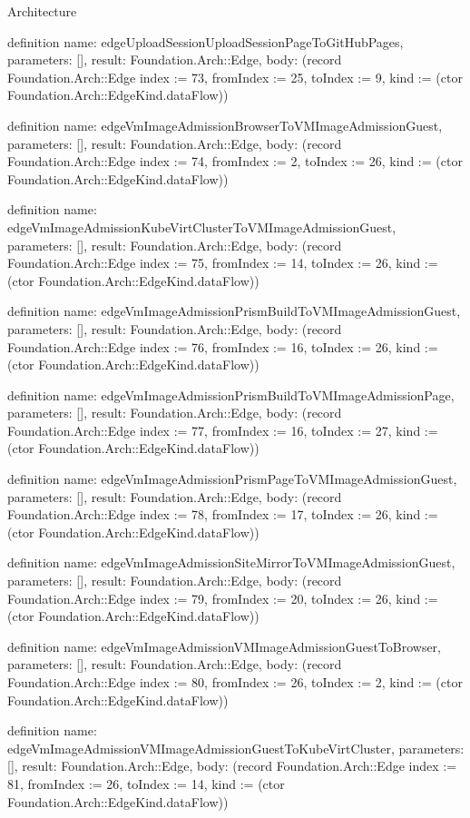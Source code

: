 \begin{lexlean}{Architecture}
\begin{semanticmodule}
definition{
  name: edgeUploadSessionUploadSessionPageToGitHubPages,
  parameters: [],
  result: Foundation.Arch::Edge,
  body: (record Foundation.Arch::Edge {index := 73, fromIndex := 25, toIndex := 9, kind := (ctor Foundation.Arch::EdgeKind.dataFlow)})
}

definition{
  name: edgeVmImageAdmissionBrowserToVMImageAdmissionGuest,
  parameters: [],
  result: Foundation.Arch::Edge,
  body: (record Foundation.Arch::Edge {index := 74, fromIndex := 2, toIndex := 26, kind := (ctor Foundation.Arch::EdgeKind.dataFlow)})
}

definition{
  name: edgeVmImageAdmissionKubeVirtClusterToVMImageAdmissionGuest,
  parameters: [],
  result: Foundation.Arch::Edge,
  body: (record Foundation.Arch::Edge {index := 75, fromIndex := 14, toIndex := 26, kind := (ctor Foundation.Arch::EdgeKind.dataFlow)})
}

definition{
  name: edgeVmImageAdmissionPrismBuildToVMImageAdmissionGuest,
  parameters: [],
  result: Foundation.Arch::Edge,
  body: (record Foundation.Arch::Edge {index := 76, fromIndex := 16, toIndex := 26, kind := (ctor Foundation.Arch::EdgeKind.dataFlow)})
}

definition{
  name: edgeVmImageAdmissionPrismBuildToVMImageAdmissionPage,
  parameters: [],
  result: Foundation.Arch::Edge,
  body: (record Foundation.Arch::Edge {index := 77, fromIndex := 16, toIndex := 27, kind := (ctor Foundation.Arch::EdgeKind.dataFlow)})
}

definition{
  name: edgeVmImageAdmissionPrismPageToVMImageAdmissionGuest,
  parameters: [],
  result: Foundation.Arch::Edge,
  body: (record Foundation.Arch::Edge {index := 78, fromIndex := 17, toIndex := 26, kind := (ctor Foundation.Arch::EdgeKind.dataFlow)})
}

definition{
  name: edgeVmImageAdmissionSiteMirrorToVMImageAdmissionGuest,
  parameters: [],
  result: Foundation.Arch::Edge,
  body: (record Foundation.Arch::Edge {index := 79, fromIndex := 20, toIndex := 26, kind := (ctor Foundation.Arch::EdgeKind.dataFlow)})
}

definition{
  name: edgeVmImageAdmissionVMImageAdmissionGuestToBrowser,
  parameters: [],
  result: Foundation.Arch::Edge,
  body: (record Foundation.Arch::Edge {index := 80, fromIndex := 26, toIndex := 2, kind := (ctor Foundation.Arch::EdgeKind.dataFlow)})
}

definition{
  name: edgeVmImageAdmissionVMImageAdmissionGuestToKubeVirtCluster,
  parameters: [],
  result: Foundation.Arch::Edge,
  body: (record Foundation.Arch::Edge {index := 81, fromIndex := 26, toIndex := 14, kind := (ctor Foundation.Arch::EdgeKind.dataFlow)})
}


\end{semanticmodule}
\end{lexlean}
